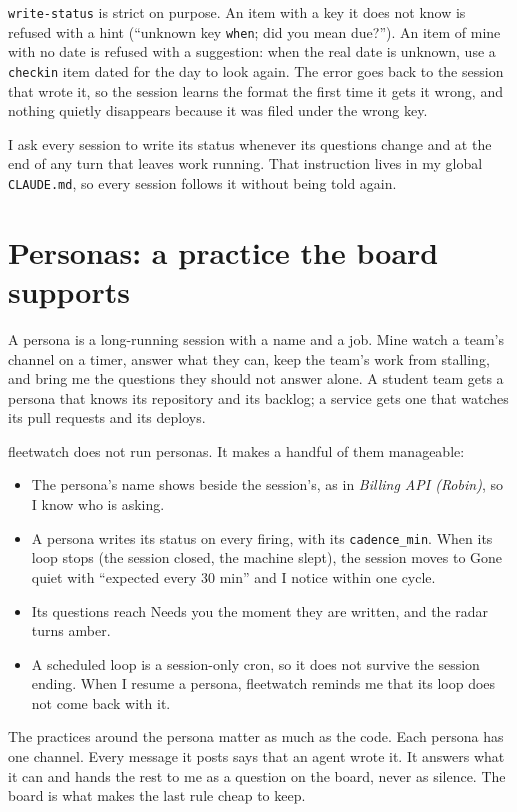 \documentclass[11pt, letterpaper]{article}
\newcommand{\cmd}[1]{\texttt{#1}}
\begin{document}
\cmd{write-status} is strict on purpose. An item with a key it does not know is refused with
a hint (``unknown key \cmd{when}; did you mean due?''). An item of mine with no date is
refused with a suggestion: when the real date is unknown, use a \cmd{checkin} item dated
for the day to look again. The error goes back to the session that wrote it, so the session
learns the format the first time it gets it wrong, and nothing quietly disappears because it
was filed under the wrong key.

I ask every session to write its status whenever its questions change and at the end of any
turn that leaves work running. That instruction lives in my global \cmd{CLAUDE.md}, so every
session follows it without being told again.

\section{Personas: a practice the board supports}

A persona is a long-running session with a name and a job. Mine watch a team's channel on a
timer, answer what they can, keep the team's work from stalling, and bring me the questions
they should not answer alone. A student team gets a persona that knows its repository and its
backlog; a service gets one that watches its pull requests and its deploys.

fleetwatch does not run personas. It makes a handful of them manageable:

\begin{itemize}
  \item The persona's name shows beside the session's, as in \emph{Billing API (Robin)}, so I
    know who is asking.
  \item A persona writes its status on every firing, with its \cmd{cadence\_min}. When its loop
    stops (the session closed, the machine slept), the session moves to Gone quiet with
    ``expected every 30 min'' and I notice within one cycle.
  \item Its questions reach Needs you the moment they are written, and the radar turns amber.
  \item A scheduled loop is a session-only cron, so it does not survive the session ending.
    When I resume a persona, fleetwatch reminds me that its loop does not come back with it.
\end{itemize}

The practices around the persona matter as much as the code. Each persona has one channel.
Every message it posts says that an agent wrote it. It answers what it can and hands the rest
to me as a question on the board, never as silence. The board is what makes the last rule
cheap to keep.
\end{document}
